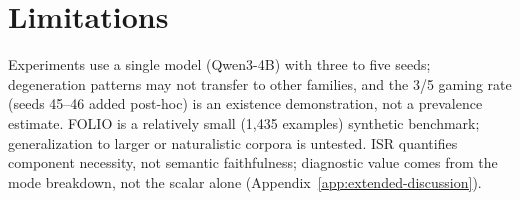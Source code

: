 \section*{Limitations}

Experiments use a single model (Qwen3-4B) with three to five seeds; degeneration patterns may not transfer to other families, and the 3/5 gaming rate (seeds 45--46 added post-hoc) is an existence demonstration, not a prevalence estimate.
FOLIO is a relatively small (1,435 examples) synthetic benchmark; generalization to larger or naturalistic corpora is untested.
ISR quantifies component necessity, not semantic faithfulness; diagnostic value comes from the mode breakdown, not the scalar alone (Appendix~\ref{app:extended-discussion}).
